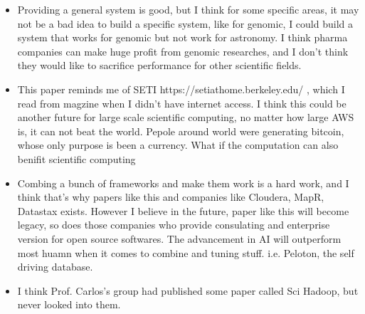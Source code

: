 \documentclass[12pt,a4paper,oneside]{article}
\begin{document}
\begin{itemize}
  \item Providing a general system is good, but I think for some specific areas, it may not be a bad idea to build a specific system, like for genomic,
I could build a system that works for genomic but not work for astronomy. I think pharma companies can make huge profit from genomic researches, and I
don't think they would like to sacrifice performance for other scientific fields.
  \item This paper reminds me of SETI https://setiathome.berkeley.edu/ , which I read from magzine when I didn't have internet access. I think this could
be another future for large scale scientific computing, no matter how large AWS is, it can not beat the world. Pepole around world were generating bitcoin,
whose only purpose is been a currency. What if the computation can also benifit scientific computing
  \item Combing a bunch of frameworks and make them work is a hard work, and I think that's why papers like this and companies like Cloudera, MapR, Datastax exists.
However I believe in the future, paper like this will become legacy, so does those companies who provide consulating and enterprise version for open source softwares.
The advancement in AI will outperform most huamn when it comes to combine and tuning stuff. i.e. Peloton, the self driving database.
  \item I think Prof. Carlos's group had published some paper called Sci Hadoop, but never looked into them.
\end{itemize}
\end{document}
